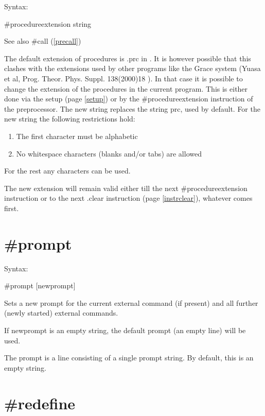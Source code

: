\noindent Syntax:

\#procedureextension string
 
\noindent See also \#call (\ref{precall})

\noindent The default extension of procedures 
is .prc in \FORM\@. It is however possible that this clashes with 
the extensions used by other programs like the Grace system 
(Yuasa et al, Prog. Theor. Phys. Suppl. 138(2000)18 ). In that case it is 
possible to change the extension of the procedures in the current program. 
This is either done via the setup (page \ref{setup}) or by the 
\#procedureextension instruction of the preprocessor. The new string 
replaces the string prc, used by default. For the new string the following 
restrictions hold:
\begin{enumerate}
\item The first character must be alphabetic
\item No whitespace characters (blanks and/or tabs) are allowed
\end{enumerate}
For the rest any characters can be used.

\noindent The new extension will remain valid either till the next 
\#procedureextension instruction or to the next .clear 
instruction (page \ref{instrclear}), whatever comes first.


\section{\#prompt}
\label{preprompt}

\noindent Syntax:

\#prompt [newprompt]

\noindent Sets a new prompt for the current external 
command (if present) and all further (newly started) external commands.

If newprompt is an empty string, the default prompt (an empty line) will be 
used.

The prompt is a line consisting of a single prompt string. By 
default, this is an empty string.


\section{\#redefine}
\label{preredefine}

